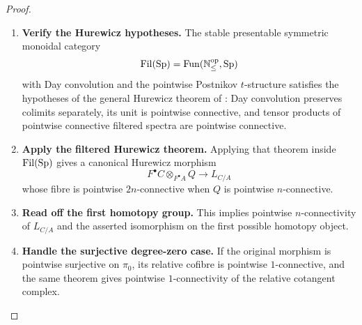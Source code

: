 \begin{proof}
\leavevmode
\begin{enumerate}[label=\textup{(\arabic*)}]
    \item \textbf{Verify the Hurewicz hypotheses.}
    The stable presentable symmetric monoidal category
    \[
        \operatorname{Fil}(\operatorname{Sp})
        =
        \operatorname{Fun}(\mathbb N_{\leq}^{\mathrm{op}},\operatorname{Sp})
    \]
    with Day convolution and the pointwise Postnikov \(t\)-structure satisfies the
    hypotheses of the general Hurewicz theorem of
    \cite[Construction~7.4.3.10 and Theorem~7.4.3.12]{LurieHigherAlgebra}:
    Day convolution preserves colimits separately, its unit is pointwise
    connective, and tensor products of pointwise connective filtered spectra are
    pointwise connective.
    \item \textbf{Apply the filtered Hurewicz theorem.}
    Applying that theorem inside
    \(\operatorname{Fil}(\operatorname{Sp})\) gives a canonical Hurewicz morphism
    \[
        F^\bullet C\otimes_{F^\bullet A}Q
        \longrightarrow
        L_{C/A}
    \]
    whose fibre is pointwise \(2n\)-connective when \(Q\) is pointwise
    \(n\)-connective.
    \item \textbf{Read off the first homotopy group.}
    This implies pointwise \(n\)-connectivity of
    \(L_{C/A}\) and the asserted isomorphism on the first possible homotopy
    object.
    \item \textbf{Handle the surjective degree-zero case.}
    If the original morphism is pointwise surjective on \(\pi_0\), its
    relative cofibre is pointwise \(1\)-connective, and the same theorem gives
    pointwise \(1\)-connectivity of the relative cotangent complex.
\end{enumerate}
\end{proof}


